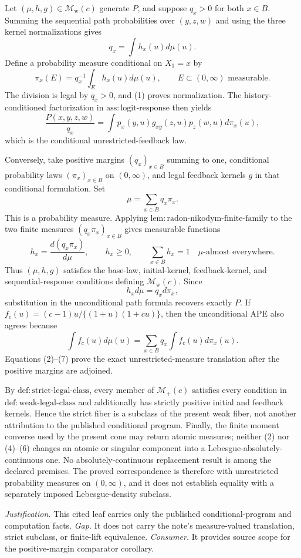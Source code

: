 \documentclass{article}
\begin{document}
Let \((\mu,h,g)\in\mathcal M_{\mathrm w}(c)\) generate \(P\), and suppose \(q_x>0\) for both \(x\in B\).  Summing the sequential path probabilities over \((y,z,w)\) and using the three kernel normalizations gives
\[
 q_x=\int h_x(u)d\mu(u). \tag{1}
\]
Define a probability measure conditional on \(X_1=x\) by
\[
 \pi_x(E)=q_x^{-1}\int_Eh_x(u)d\mu(u),
 \qquad E\subset(0,\infty)\text{ measurable}. \tag{2}
\]
The division is legal by \(q_x>0\), and (1) proves normalization.  The history-conditioned factorization in \(\mathrm{ass{:}logit\text{-}response}\) then yields
\[
 \frac{P(x,y,z,w)}{q_x}
 =\int p_x(y,u)g_{xy}(z,u)p_z(w,u)d\pi_x(u), \tag{3}
\]
which is the conditional unrestricted-feedback law.

Conversely, take positive margins \((q_x)_{x\in B}\) summing to one, conditional probability laws \((\pi_x)_{x\in B}\) on \((0,\infty)\), and legal feedback kernels \(g\) in that conditional formulation.  Set
\[
 \mu=\sum_{x\in B}q_x\pi_x. \tag{4}
\]
This is a probability measure.  Applying \(\mathrm{lem{:}radon\text{-}nikodym\text{-}finite\text{-}family}\) to the two finite measures \((q_x\pi_x)_{x\in B}\) gives measurable functions
\[
 h_x=\frac{d(q_x\pi_x)}{d\mu},
 \qquad h_x\ge0,
 \qquad \sum_{x\in B}h_x=1
 \quad\mu\text{-almost everywhere}. \tag{5}
\]
Thus \((\mu,h,g)\) satisfies the base-law, initial-kernel, feedback-kernel, and sequential-response conditions defining \(\mathcal M_{\mathrm w}(c)\).  Since
\[
 h_xd\mu=q_xd\pi_x, \tag{6}
\]
substitution in the unconditional path formula recovers exactly \(P\).  If \(f_c(u)=(c-1)u/\{(1+u)(1+cu)\}\), then the unconditional APE also agrees because
\[
 \int f_c(u)d\mu(u)
 =\sum_{x\in B}q_x\int f_c(u)d\pi_x(u). \tag{7}
\]
Equations (2)--(7) prove the exact unrestricted-measure translation after the positive margins are adjoined.

By \(\mathrm{def{:}strict\text{-}legal\text{-}class}\), every member of \(\mathcal M_+(c)\) satisfies every condition in \(\mathrm{def{:}weak\text{-}legal\text{-}class}\) and additionally has strictly positive initial and feedback kernels.  Hence the strict fiber is a subclass of the present weak fiber, not another attribution to the published conditional program.  Finally, the finite moment converse used by the present cone may return atomic measures; neither (2) nor (4)--(6) changes an atomic or singular component into a Lebesgue-absolutely-continuous one.  No absolutely-continuous replacement result is among the declared premises.  The proved correspondence is therefore with unrestricted probability measures on \((0,\infty)\), and it does not establish equality with a separately imposed Lebesgue-density subclass.
\par\smallskip\noindent \textit{Justification.} This cited leaf carries only the published conditional-program and computation facts. \textit{Gap.} It does not carry the note's measure-valued translation, strict subclass, or finite-lift equivalence. \textit{Consumer.} It provides source scope for the positive-margin comparator corollary.
\end{document}
